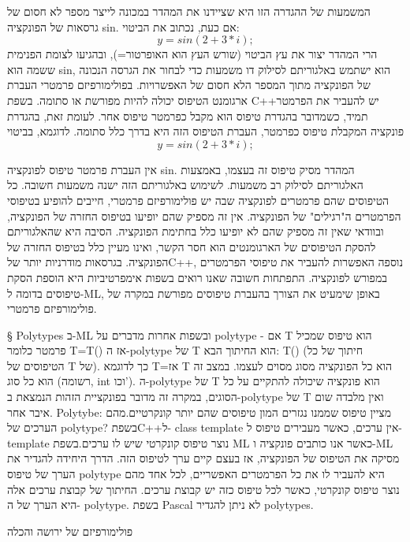 המשמעות של ההגדרה הזו היא שציידנו את המהדר במכונה לייצר מספר לא חסום של גרסאות של הפונקציה sin. אם כעת, נכתוב את הביטוי:
\begin{equation}
        y=sin(2+3 *i);
\end{equation}
הרי המהדר יצור את עץ הביטוי (שורש העץ הוא האופרטור=), ובהגיעו לצומת הפנימית
ששמה הוא sin, הוא ישתמש באלגוריתם לסילוק דו משמעות כדי לבחור את הגרסה הנכונה של
הפונקציה מתוך המספר הלא חסום של האפשרויות. בפולימורפיזם פרמטרי העברת ארגומנט
הטיפוס יכולה להיות מפורשת או סתומה. בשפת C++יש להעביר את הפרמטר תמיד, כשמדובר
בהגדרת טיפוס הוא מקבל כפרמטר טיפוס אחר. לעומת זאת, בהגדרת פונקציה המקבלת טיפוס
כפרמטר, העברת הטיפוס הזה היא בדרך כלל סתומה. לדוגמא, בביטוי
\begin{equation}
        y=sin(2+3 *i);
\end{equation}

אין העברת פרמטר טיפוס לפונקציה sin. המהדר מסיק טיפוס זה בעצמו, באמצעות
האלגוריתם לסילוק רב משמעות. לשימוש באלגוריתם הזה ישנה משמעות חשובה. כל הטיפוסים
שהם פרמטרים לפונקציה שבה יש פולימורפיזם פרמטרי, חייבים להופיע בטיפוסי הפרמטרים
ה"רגילים" של הפונקציה. אין זה מספיק שהם יופיעו בטיפוס החזרה של הפונקציה,
ובוודאי שאין זה מספיק שהם לא יופיעו כלל בחתימת הפונקציה. הסיבה היא שהאלגוריתם
להסקת הטיפוסים של הארגומנטים הוא חסר הקשר, ואינו מעיין כלל בטיפוס החזרה של
הפונקציה. בגרסאות מודרניות יותר שלC++, נוספה האפשרות להעביר את טיפוסי
הפרמטרים במפורש לפונקציה. התפתחות חשובה שאנו רואים בשפות אימפרטיביות היא הוספת
הסקת טיפוסים בדומה ל-ML, באופן שימעיט את הצורך בהעברת טיפוסים מפורשת במקרה של
פולימורפיזם פרמטרי.

§ Polytypes
ב-ML ובשפות אחרות מדברים על polytype - אם T הוא טיפוס שמכיל פרמטר כלומר T=T()
אז ה-polytype של T הוא החיתוך הבא: T() (חיתוך של כל הטיפוסים של T של). כך
לדוגמא T=אז T הוא כל הפונקציה מסוג מסוים לעצמו. במצב זה הוא כל סוג (רשומה, int
וכו'). ה-polytype של T הוא פונקציה שיכולה להתקיים על כל הסוגים, במקרה זה מדובר
בפונקציית הזהות הנמצאת ב-polytype של T ואין מלבדה שום איבר אחר. Polytybe:
מציין טיפוס שממנו נגזרים המון טיפוסים שהם יותר קונקרטיים.מהם הערכים של
polytype? בשפתC++ל- class template אין ערכים, כאשר מעבירים טיפוס ל- template
נוצר טיפוס קונקרטי שיש לו ערכים.בשפת ML כאשר אנו כותבים פונקציה ו-ML מסיקה את
הטיפוס של הפונקציה, אז בעצם קיים ערך לטיפוס הזה. הדרך היחידה להגדיר את הערך של
טיפוס polytype היא להעביר לו את כל הפרמטרים האפשריים, לכל אחד מהם נוצר טיפוס
קונקרטי, כאשר לכל טיפוס כזה יש קבוצת ערכים. החיתוך של קבוצת ערכים אלה היא הערך
של ה- polytype. בשפת Pascal לא ניתן להגדיר polytypes.

        פולימורפיזם של ירושה והכלה

